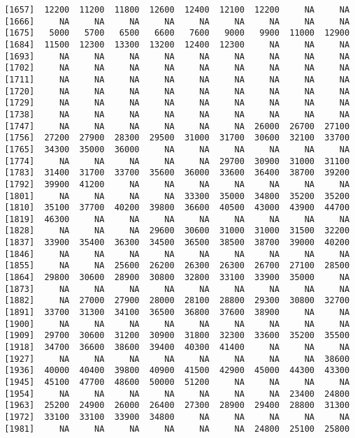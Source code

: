 \documentclass[]{article}
\begin{document}
\begin{verbatim}
 [1657]  12200  11200  11800  12600  12400  12100  12200     NA     NA
 [1666]     NA     NA     NA     NA     NA     NA     NA     NA     NA
 [1675]   5000   5700   6500   6600   7600   9000   9900  11000  12900
 [1684]  11500  12300  13300  13200  12400  12300     NA     NA     NA
 [1693]     NA     NA     NA     NA     NA     NA     NA     NA     NA
 [1702]     NA     NA     NA     NA     NA     NA     NA     NA     NA
 [1711]     NA     NA     NA     NA     NA     NA     NA     NA     NA
 [1720]     NA     NA     NA     NA     NA     NA     NA     NA     NA
 [1729]     NA     NA     NA     NA     NA     NA     NA     NA     NA
 [1738]     NA     NA     NA     NA     NA     NA     NA     NA     NA
 [1747]     NA     NA     NA     NA     NA     NA  26000  26700  27100
 [1756]  27200  27900  28300  29500  31000  31700  30600  32100  33700
 [1765]  34300  35000  36000     NA     NA     NA     NA     NA     NA
 [1774]     NA     NA     NA     NA     NA  29700  30900  31000  31100
 [1783]  31400  31700  33700  35600  36000  33600  36400  38700  39200
 [1792]  39900  41200     NA     NA     NA     NA     NA     NA     NA
 [1801]     NA     NA     NA     NA  33300  35000  34800  35200  35200
 [1810]  35100  37700  40200  39800  36600  40500  43000  43900  44700
 [1819]  46300     NA     NA     NA     NA     NA     NA     NA     NA
 [1828]     NA     NA     NA  29600  30600  31000  31000  31500  32200
 [1837]  33900  35400  36300  34500  36500  38500  38700  39000  40200
 [1846]     NA     NA     NA     NA     NA     NA     NA     NA     NA
 [1855]     NA     NA  25600  26200  26300  26300  26700  27100  28500
 [1864]  29800  30600  28900  30800  32800  33100  33900  35000     NA
 [1873]     NA     NA     NA     NA     NA     NA     NA     NA     NA
 [1882]     NA  27000  27900  28000  28100  28800  29300  30800  32700
 [1891]  33700  31300  34100  36500  36800  37600  38900     NA     NA
 [1900]     NA     NA     NA     NA     NA     NA     NA     NA     NA
 [1909]  29700  30600  31200  30900  31800  32300  33600  35200  35500
 [1918]  34700  36600  38600  39400  40300  41400     NA     NA     NA
 [1927]     NA     NA     NA     NA     NA     NA     NA     NA  38600
 [1936]  40000  40400  39800  40900  41500  42900  45000  44300  43300
 [1945]  45100  47700  48600  50000  51200     NA     NA     NA     NA
 [1954]     NA     NA     NA     NA     NA     NA     NA  23400  24800
 [1963]  25200  24900  26000  26400  27300  28900  29400  28800  31300
 [1972]  33100  33100  33900  34800     NA     NA     NA     NA     NA
 [1981]     NA     NA     NA     NA     NA     NA  24800  25100  25800

\end{verbatim}
\end{document}
